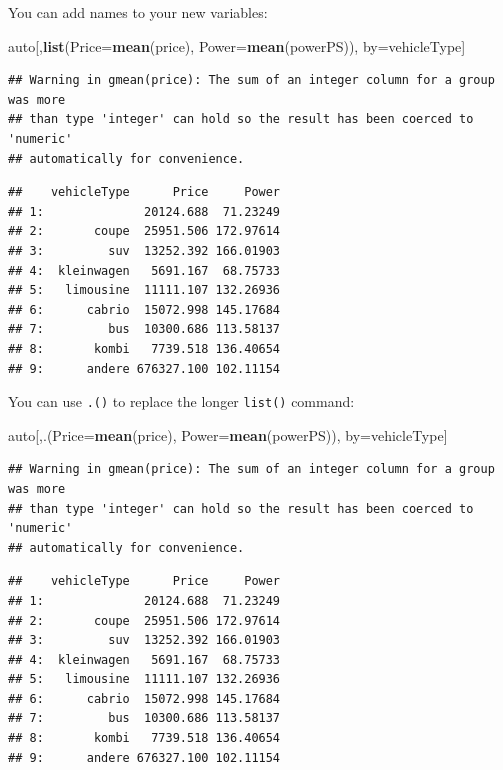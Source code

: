 \documentclass[]{book}
\newenvironment{Shaded}{\begin{snugshade}}{\end{snugshade}}
\newcommand{\KeywordTok}[1]{\textcolor[rgb]{0.13,0.29,0.53}{\textbf{#1}}}
\newcommand{\DataTypeTok}[1]{\textcolor[rgb]{0.13,0.29,0.53}{#1}}
\newcommand{\NormalTok}[1]{#1}
\theoremstyle{definition}
\theoremstyle{definition}
\theoremstyle{definition}
\theoremstyle{remark}
\begin{document}
You can add names to your new variables:

\begin{Shaded}
\begin{Highlighting}[]
\NormalTok{auto[,}\KeywordTok{list}\NormalTok{(}\DataTypeTok{Price=}\KeywordTok{mean}\NormalTok{(price), }\DataTypeTok{Power=}\KeywordTok{mean}\NormalTok{(powerPS)), by=vehicleType]}
\end{Highlighting}
\end{Shaded}

\begin{verbatim}
## Warning in gmean(price): The sum of an integer column for a group was more
## than type 'integer' can hold so the result has been coerced to 'numeric'
## automatically for convenience.
\end{verbatim}

\begin{verbatim}
##    vehicleType      Price     Power
## 1:              20124.688  71.23249
## 2:       coupe  25951.506 172.97614
## 3:         suv  13252.392 166.01903
## 4:  kleinwagen   5691.167  68.75733
## 5:   limousine  11111.107 132.26936
## 6:      cabrio  15072.998 145.17684
## 7:         bus  10300.686 113.58137
## 8:       kombi   7739.518 136.40654
## 9:      andere 676327.100 102.11154
\end{verbatim}

You can use \texttt{.()} to replace the longer \texttt{list()} command:

\begin{Shaded}
\begin{Highlighting}[]
\NormalTok{auto[,.(}\DataTypeTok{Price=}\KeywordTok{mean}\NormalTok{(price), }\DataTypeTok{Power=}\KeywordTok{mean}\NormalTok{(powerPS)), by=vehicleType]}
\end{Highlighting}
\end{Shaded}

\begin{verbatim}
## Warning in gmean(price): The sum of an integer column for a group was more
## than type 'integer' can hold so the result has been coerced to 'numeric'
## automatically for convenience.
\end{verbatim}

\begin{verbatim}
##    vehicleType      Price     Power
## 1:              20124.688  71.23249
## 2:       coupe  25951.506 172.97614
## 3:         suv  13252.392 166.01903
## 4:  kleinwagen   5691.167  68.75733
## 5:   limousine  11111.107 132.26936
## 6:      cabrio  15072.998 145.17684
## 7:         bus  10300.686 113.58137
## 8:       kombi   7739.518 136.40654
## 9:      andere 676327.100 102.11154
\end{verbatim}
\end{document}
